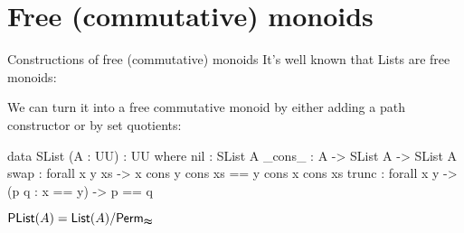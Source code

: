 \documentclass[9pt]{beamer}
\begin{document}
\section{Free (commutative) monoids}

\begin{frame}[fragile]{Constructions of free (commutative) monoids}
    It's well known that Lists are free monoids:


    We can turn it into a free commutative monoid by either adding a path
    constructor or by set quotients:

    \begin{dblock}
        \begin{code}
data SList (A : UU) : UU where
  nil : SList A
  _cons_ : A -> SList A -> SList A
  swap : forall x y xs -> x cons y cons xs == y cons x cons xs 
  trunc : forall x y -> (p q : x == y) -> p == q
        \end{code}
    \end{dblock}

    \begin{dblock}
        $\mathsf{PList}(A) = \mathsf{List}(A) / \mathsf{Perm}_{\mathrel{\boldsymbol{\approx}}}$
    \end{dblock}
    
    

    
\end{frame}
\end{document}
